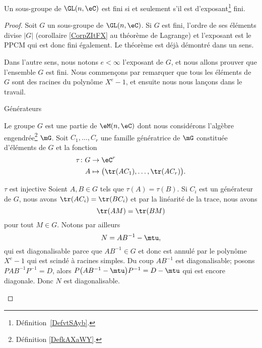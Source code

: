 \begin{theorem}\label{ThooJLTit}
    Un sous-groupe de \( \GL(n,\eC)\) est fini si et seulement s'il est d'exposant\footnote{Définition~\ref{DefvtSAyb}.} fini.
\end{theorem}

\begin{proof}
    Soit \( G\) un sous-groupe de \( \GL(n,\eC)\). Si \( G\) est fini, l'ordre de ses éléments divise \( | G |\) (corollaire \ref{CorpZItFX} au théorème de Lagrange) et l'exposant est le PPCM qui est donc fini également. Le théorème est déjà démontré dans un sens.

    Dans l'autre sens, nous notons \( e<\infty\) l'exposant de \( G\), et nous allons prouver que l'ensemble \( G\) est fini. Nous commençons par remarquer que tous les éléments de \( G\) sont des racines du polynôme \( X^e-1\), et ensuite nous nous lançons dans le travail.

    \begin{subproof}
        \item[Générateurs]

            Le groupe \( G\) est une partie de \( \eM(n,\eC)\) dont nous considérons l'algèbre engendrée\footnote{Définition \ref{DefkAXaWY}.} \( \mG\). Soit \( C_1,\ldots, C_r\) une famille génératrice de \( \mG\) constituée d'éléments de \( G\) et la fonction
            \begin{equation}
                \begin{aligned}
                    \tau\colon G&\to \eC^r \\
                    A&\mapsto \big( \tr(AC_1),\ldots, \tr(AC_r) \big).
                \end{aligned}
            \end{equation}

        \item[\( \tau\) est injective] Soient \( A,B\in G\) tels que \( \tau(A)=\tau(B)\). Si \( C_i\) est un générateur de \( G\), nous avons \( \tr(AC_i)=\tr(BC_i)\) et par la linéarité de la trace, nous avons
            \begin{equation}    \label{EqnCYmKW}
                \tr(AM)=\tr(BM)
            \end{equation}
            pour tout \( M\in G\). Notons par ailleurs
            \begin{equation}
                N=AB^{-1}-\mtu,
            \end{equation}
            qui est diagonalisable parce que \( AB^{-1}\in G\) et donc est annulé par le polynôme \( X^e-1\) qui est scindé à racines simples. Du coup \( AB^{-1}\) est diagonalisable; posons \( PAB^{-1}P^{-1}=D\), alors \( P\big( AB^{-1}-\mtu \big)P^{-1}=D-\mtu\) qui est encore diagonale. Donc \( N\) est diagonalisable.


\end{subproof}
\end{proof}
